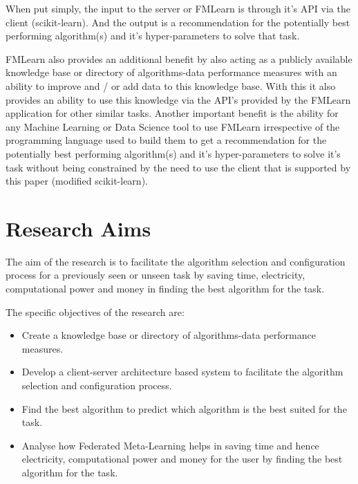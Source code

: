 When put simply, the input to the server or FMLearn is through it's API via the client (scikit-learn). And the output is a recommendation for the potentially best performing algorithm(s) and it's hyper-parameters to solve that task.

FMLearn also provides an additional benefit by also acting as a publicly available knowledge base or directory of algorithms-data performance measures with an ability to improve and / or add data to this knowledge base. With this it also provides an ability to use this knowledge via the API's provided by the FMLearn application for other similar tasks. Another important benefit is the ability for any Machine Learning or Data Science tool to use FMLearn irrespective of the programming language used to build them to get a recommendation for the potentially best performing algorithm(s) and it's hyper-parameters to solve it's task without being constrained by the need to use the client that is supported by this paper (modified scikit-learn).

\section{Research Aims}
The aim of the research is to facilitate the algorithm selection and configuration process for a previously seen or unseen task by saving time, electricity, computational power and money in finding the best algorithm for the task. 

The specific objectives of the research are:

\begin{itemize}
    \item Create a knowledge base or directory of algorithms-data performance measures.
    \item Develop a client-server architecture based system to facilitate the algorithm selection and configuration process.
    \item Find the best algorithm to predict which algorithm is the best suited for the task.
    \item Analyse how Federated Meta-Learning helps in saving time and hence electricity, computational power and money for the user by finding the best algorithm for the task.
\end{itemize}



